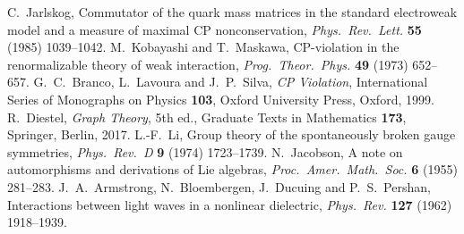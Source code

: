  C.~Jarlskog, Commutator of the quark mass matrices in the standard electroweak model and a measure of maximal CP nonconservation, \emph{Phys.\ Rev.\ Lett.} \textbf{55} (1985) 1039--1042.
 M.~Kobayashi and T.~Maskawa, CP-violation in the renormalizable theory of weak interaction, \emph{Prog.\ Theor.\ Phys.} \textbf{49} (1973) 652--657.
 G.~C.~Branco, L.~Lavoura and J.~P.~Silva, \emph{CP Violation}, International Series of Monographs on Physics \textbf{103}, Oxford University Press, Oxford, 1999.
 R.~Diestel, \emph{Graph Theory}, 5th ed., Graduate Texts in Mathematics \textbf{173}, Springer, Berlin, 2017.
 L.-F.~Li, Group theory of the spontaneously broken gauge symmetries, \emph{Phys.\ Rev.\ D} \textbf{9} (1974) 1723--1739.
 N.~Jacobson, A note on automorphisms and derivations of Lie algebras, \emph{Proc.\ Amer.\ Math.\ Soc.} \textbf{6} (1955) 281--283.
 J.~A.~Armstrong, N.~Bloembergen, J.~Ducuing and P.~S.~Pershan, Interactions between light waves in a nonlinear dielectric, \emph{Phys.\ Rev.} \textbf{127} (1962) 1918--1939.
